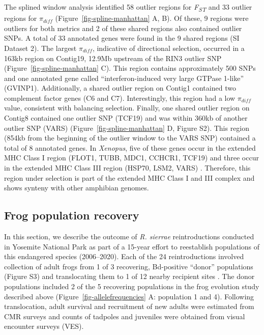\documentclass[9pt,twocolumn,twoside,lineno]{pnas-new}
\begin{document}
The splined window analysis identified 58 outlier regions for
\emph{F\textsubscript{ST}} and 33 outlier regions for \(\pi_{diff}\)
(Figure~\ref{fig-spline-manhattan} A, B). Of these, 9 regions were
outliers for both metrics and 2 of these shared regions also contained
outlier SNPs. A total of 33 annotated genes were found in the 9 shared
regions (SI Dataset 2). The largest \(\pi_{diff}\), indicative of
directional selection, occurred in a 163kb region on Contig19, 12.9Mb
upstream of the RIN3 outlier SNP (Figure~\ref{fig-spline-manhattan} C).
This region contains approximately 500 SNPs and one annotated gene
called ``interferon-induced very large GTPase 1-like'' (GVINP1).
Additionally, a shared outlier region on Contig1 contained two
complement factor genes (C6 and C7). Interestingly, this region had a
low \(\pi_{diff}\) value, consistent with balancing selection. Finally,
one shared outlier region on Contig8 contained one outlier SNP (TCF19)
and was within 360kb of another outlier SNP (VARS)
(Figure~\ref{fig-spline-manhattan} D, Figure S2).
This region (854kb from the beginning of the outlier window to the VARS
SNP) contained a total of 8 annotated genes. In \emph{Xenopus}, five of
these genes occur in the extended MHC Class I region (FLOT1, TUBB, MDC1,
CCHCR1, TCF19) and three occur in the extended MHC Class III region
(HSP70, LSM2, VARS) \citep{ohta2006}. Therefore, this region under
selection is part of the extended MHC Class I and III complex and shows
synteny with other amphibian genomes.

\subsection*{Frog population recovery}

In this section, we describe the outcome of \emph{R. sierrae}
reintroductions conducted in Yosemite National Park as part of a 15-year
effort to reestablish populations of this endangered species
(2006--2020). Each of the 24 reintroductions involved collection of
adult frogs from 1 of 3 recovering, Bd-positive ``donor'' populations
(Figure S3) and translocating them to 1 of 12 nearby
recipient sites \citep{seddon2014}. The donor populations included 2 of
the 5 recovering populations in the frog evolution study described above
(Figure~\ref{fig-allelefrequencies} A: population 1 and 4). Following
translocation, adult survival and recruitment of new adults were
estimated from CMR surveys and counts of tadpoles and juveniles were
obtained from visual encounter surveys (VES).
\end{document}
